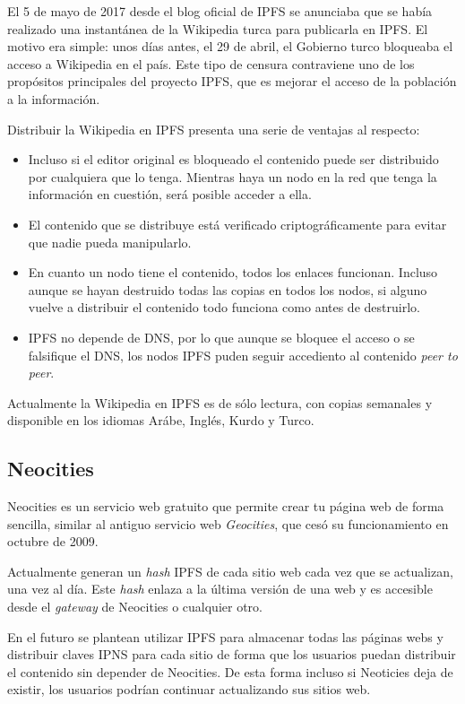 \documentclass[12pt]{article} %
\begin{document}
El 5 de mayo de 2017 desde el blog oficial de IPFS se anunciaba que se había realizado una instantánea de la Wikipedia turca para publicarla en IPFS. El motivo era simple: unos días antes, el 29 de abril, el Gobierno turco bloqueaba el acceso a Wikipedia en el país. Este tipo de censura contraviene uno de los propósitos principales del proyecto IPFS, que es mejorar el acceso de la población a la información.

Distribuir la Wikipedia en IPFS presenta una serie de ventajas al respecto:
\begin{itemize}
	\item Incluso si el editor original es bloqueado el contenido puede ser distribuido por cualquiera que lo tenga. Mientras haya un nodo en la red que tenga la información en cuestión, será posible acceder a ella.
	\item El contenido que se distribuye está verificado criptográficamente para evitar que nadie pueda manipularlo.
	\item En cuanto un nodo tiene el contenido, todos los enlaces funcionan. Incluso aunque se hayan destruido todas las copias en todos los nodos, si alguno vuelve a distribuir el contenido todo funciona como antes de destruirlo.
	\item IPFS no depende de DNS, por lo que aunque se bloquee el acceso o se falsifique el DNS, los nodos IPFS puden seguir accediento al contenido \textit{peer to peer}.
\end{itemize}

Actualmente la Wikipedia en IPFS es de sólo lectura, con copias semanales y disponible en los idiomas Arábe, Inglés, Kurdo y Turco.


\subsection{Neocities} %
\label{sub:neocities}

Neocities es un servicio web gratuito que permite crear tu página web de forma sencilla, similar al antiguo servicio web \textit{Geocities}, que cesó su funcionamiento en octubre de 2009.

Actualmente generan un \textit{hash} IPFS de cada sitio web cada vez que se actualizan, una vez al día. Este \textit{hash} enlaza a la última versión de una web y es accesible desde el \textit{gateway} de Neocities o cualquier otro. 

En el futuro se plantean utilizar IPFS para almacenar todas las páginas webs y distribuir claves IPNS para cada sitio de forma que los usuarios puedan distribuir el contenido sin depender de Neocities. De esta forma incluso si Neoticies deja de existir, los usuarios podrían continuar actualizando sus sitios web.
\end{document}
